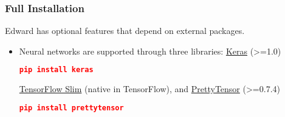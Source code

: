 \subsubsection{Full Installation}

Edward has optional features that depend on external packages.

\begin{itemize}
  \item Neural networks are supported through three
  libraries:
  \href{http://keras.io}{Keras} (>=1.0)
\begin{lstlisting}[language=JSON]
pip install keras
\end{lstlisting}
\href{https://github.com/tensorflow/tensorflow/tree/master/tensorflow/contrib/slim}{TensorFlow
Slim} (native in TensorFlow), and
\href{https://github.com/google/prettytensor}{PrettyTensor} (>=0.7.4)
\begin{lstlisting}[language=JSON]
pip install prettytensor
\end{lstlisting}
\end{itemize}
